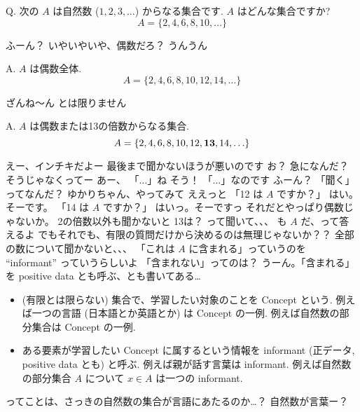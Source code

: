 \begin{boxnote}
    {\rm Q.} 次の $A$ は自然数 ($1, 2, 3, \ldots$) からなる集合です.  $A$ はどんな集合ですか?
$$A = \{2, 4, 6, 8, 10, \ldots\}$$
\end{boxnote}

\YUI ふーん？
\YUI いやいやいや、偶数だろ？
\YUKARI うんうん

\begin{boxnote}
    {\rm A.} $A$ は偶数全体.
    $$A = \{2, 4, 6, 8, 10, 12, 14, \ldots\}$$
\end{boxnote}

\YUZUKO ざんね〜ん
\YUZUKO とは限りません

\begin{boxnote}
    {\rm A.} $A$ は偶数または13の倍数からなる集合.
    $$A = \{2, 4, 6, 8, 10, 12, {\bf 13}, 14, \ldots\}$$
\end{boxnote}

\YUKARI えー、インチキだよー
\YUZUKO 最後まで聞かないほうが悪いのです
\YUI お？ 急になんだ？
\YUZUKO そうじゃなくってー
\YUKARI あー、 「$\dots$」ね
\YUZUKO そう！ 「$\dots$」なのです
\YUI ふーん？ 「聞く」ってなんだ？
\YUZUKO ゆかりちゃん、やってみて
\YUKARI ええっと
\YUKARI 「12 は $A$ ですか？」
\YUZUKO はい。そーです。
\YUKARI 「14 は $A$ ですか？」
\YUZUKO はいっ。そーですっ
\YUI それだとやっぱり偶数じゃないか。 2の倍数以外も聞かないと
\YUI 13は？ って聞いて、、、
 も $A$ だ、って答えるよ
\YUI でもそれでも、有限の質問だけから決めるのは無理じゃないか？？
\YUI 全部の数について聞かないと、、、
\YUZUKO 「これは $A$ に含まれる」っていうのを ``informant'' っていうらしいよ
\YUKARI 「含まれない」ってのは？
\YUZUKO うーん。「含まれる」を positive data とも呼ぶ、とも書いてある…

\begin{boxnote}
    \begin{itemize}
        \item
            (有限とは限らない) 集合で、学習したい対象のことを Concept という.
            例えば一つの言語 (日本語とか英語とか) は Concept の一例.
            例えば自然数の部分集合は Concept の一例.
        \item
            ある要素が学習したい Concept に属するという情報を informant (正データ, positive data とも) と呼ぶ.
            例えば親が話す言葉は informant.
            例えば自然数の部分集合 $A$ について $x \in A$ は一つの informant.
    \end{itemize}
\end{boxnote}

\YUI ってことは、さっきの自然数の集合が言語にあたるのか…？
\YUKARI 自然数が言葉ー？

